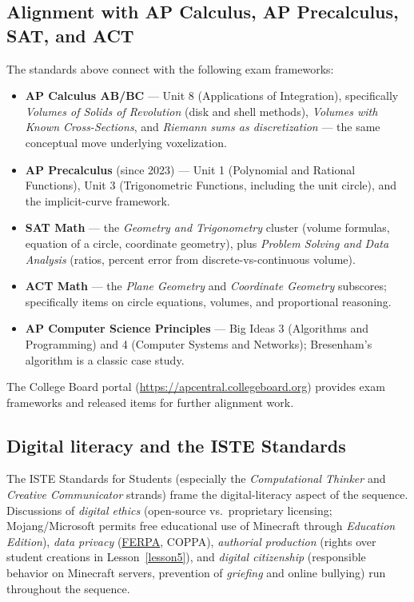 \documentclass[12pt,a4paper]{scrartcl}
\newcommand{\acc}[1]{\textcolor{accent}{\textbf{#1}}}
\begin{document}
\subsection{Alignment with AP Calculus, AP Precalculus, SAT, and ACT}\label{sec:ap}

The standards above connect with the following exam frameworks:

\begin{itemize}[leftmargin=1.3em,itemsep=0.15em,topsep=0.3em]
  \item \acc{AP Calculus AB/BC} --- Unit 8 (Applications of Integration), specifically \emph{Volumes of Solids of Revolution} (disk and shell methods), \emph{Volumes with Known Cross-Sections}, and \emph{Riemann sums as discretization} --- the same conceptual move underlying voxelization.
  \item \acc{AP Precalculus} (since 2023) --- Unit 1 (Polynomial and Rational Functions), Unit 3 (Trigonometric Functions, including the unit circle), and the implicit-curve framework.
  \item \acc{SAT Math} --- the \emph{Geometry and Trigonometry} cluster (volume formulas, equation of a circle, coordinate geometry), plus \emph{Problem Solving and Data Analysis} (ratios, percent error from discrete-vs-continuous volume).
  \item \acc{ACT Math} --- the \emph{Plane Geometry} and \emph{Coordinate Geometry} subscores; specifically items on circle equations, volumes, and proportional reasoning.
  \item \acc{AP Computer Science Principles} --- Big Ideas 3 (Algorithms and Programming) and 4 (Computer Systems and Networks); Bresenham's algorithm is a classic case study.
\end{itemize}

The College Board portal (\url{https://apcentral.collegeboard.org}) provides exam frameworks and released items for further alignment work.

\subsection{Digital literacy and the ISTE Standards}

The ISTE Standards for Students (especially the \emph{Computational Thinker} and \emph{Creative Communicator} strands) frame the digital-literacy aspect of the sequence. Discussions of \emph{digital ethics} (open-source vs.\ proprietary licensing; Mojang/Microsoft permits free educational use of Minecraft through \emph{Education Edition}), \emph{data privacy} (\href{https://studentprivacy.ed.gov/}{FERPA}, COPPA), \emph{authorial production} (rights over student creations in Lesson~\ref{lesson5}), and \emph{digital citizenship} (responsible behavior on Minecraft servers, prevention of \emph{griefing} and online bullying) run throughout the sequence.
\end{document}
